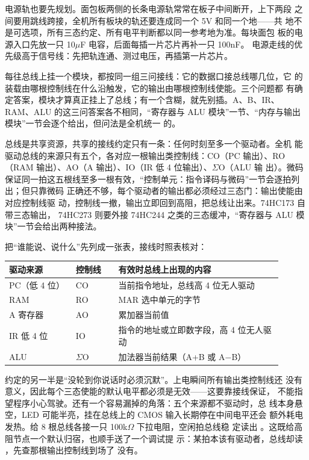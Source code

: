 电源轨也要先规划。面包板两侧的长条电源轨常常在板子中间断开，上下两段
之间要用跳线跨接，全机所有板块的轨还要连成同一个 5V 和同一个地——共
地不是可选项，所有三态约定、所有电平判断都以同一参考地为准。每块面包
板的电源入口先放一只 10$\mu$F 电容，后面每插一片芯片再补一只 100nF。
电源走线的优先级高于信号线：先把轨连通、测过电压，再插第一片芯片。

每往总线上挂一个模块，都按同一组三问接线：它的数据口接总线哪几位，它
的装载由哪根控制线在什么沿触发，它的输出由哪根控制线使能。三个问题都
有确定答案，模块才算真正挂上了总线；有一个含糊，就先别插。A、B、IR、
RAM、ALU 的这三问答案各不相同，“寄存器与 ALU 模块”一节、“内存与输出模块”一节会逐个给出，但问法是全机统一
的。

总线是共享资源，共享的接线约定只有一条：任何时刻至多一个驱动者。全机
能驱动总线的来源只有五个，各对应一根输出类控制线：CO（PC 输出）、RO
（RAM 输出）、AO（A 输出）、IO（IR 低 4 位输出）、$\Sigma$O（ALU 输
出）。微码保证同一拍这五根线至多一根有效，“控制单元：指令译码与微码”一节会逐拍列出；但只靠微码
正确还不够，每个驱动者的输出都必须经过三态门：输出使能由对应控制线驱
动，控制线一撤，输出立即回到高阻，把总线让出来。74HC173 自带三态输出，
74HC273 则要外接 74HC244 之类的三态缓冲，“寄存器与 ALU 模块”一节会给出两种接法。

把“谁能说、说什么”先列成一张表，接线时照表核对：

\begin{longtable}{L{0.22\linewidth}L{0.14\linewidth}L{0.54\linewidth}}
\toprule
驱动来源 & 控制线 & 有效时总线上出现的内容 \\
\midrule
PC（低 4 位） & CO & 当前指令地址，总线高 4 位无人驱动 \\\tablerowrule
RAM & RO & MAR 选中单元的字节 \\\tablerowrule
A 寄存器 & AO & 累加器当前值 \\\tablerowrule
IR 低 4 位 & IO & 指令的地址或立即数字段，高 4 位无人驱动 \\\tablerowrule
ALU & $\Sigma$O & 加法器当前结果（A+B 或 A$-$B） \\
\bottomrule
\end{longtable}

约定的另一半是“没轮到你说话时必须沉默”。上电瞬间所有输出类控制线还
没有意义，因此每个三态使能的默认电平都必须是无效——这要靠接线保证，
不能指望程序小心驾驶。还有一个容易漏掉的角落：五个来源都不驱动时，总
线本身悬空，LED 可能半亮，挂在总线上的 CMOS 输入长期停在中间电平还会
额外耗电发热。给 8 根总线各接一只 100k$\Omega$ 下拉电阻，空闲拍总线稳
定读出 。这既给高阻节点一个默认归宿，也顺手送了一个调试提
示：某拍本该有驱动者，总线却读 ，先查那根输出控制线到场了
没有。

